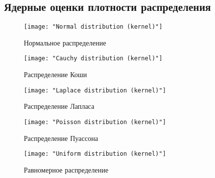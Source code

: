 \documentclass[12pt,a4paper]{article}
\begin{document}
	\subsection{Ядерные оценки плотности распределения}
	\begin{center}
		\begin{figure}[hp!]
			\texttt{[image: "Normal distribution (kernel)"]} 
			\caption[Нормальное распределение]{Нормальное распределение}
		\end{figure}
		
		\begin{figure}[hp!]
			\texttt{[image: "Cauchy distribution (kernel)"]}
			\caption[Распределение Коши]{Распределение Коши}
		\end{figure}
		
		\begin{figure}[hp!]
			\texttt{[image: "Laplace distribution (kernel)"]}
			\caption[Распределение Лапласа]{Распределение Лапласа}
		\end{figure}
		
		\begin{figure}[hp!]
			\texttt{[image: "Poisson distribution (kernel)"]}
			\caption[Распределение Пуассона]{Распределение Пуассона}
		\end{figure}
		
		\begin{figure}[hp!]			
			\texttt{[image: "Uniform distribution (kernel)"]}
			\caption[Равномерное распределение]{Равномерное распределение}
		\end{figure}
	\end{center}

	\newpage
\end{document}
